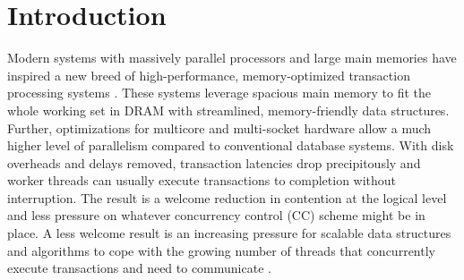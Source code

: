 
\section{Introduction}

Modern systems with massively parallel processors and large main memories have inspired a new breed of high-performance, memory-optimized transaction processing systems \cite{Kallman+08,PandisJHA10,KemperN11,LarsonBDFPZ11,LevandoskiLSSW15,TuZKLM13}. These systems leverage spacious main memory to fit the whole working set in DRAM with streamlined, memory-friendly data structures. Further, optimizations for multicore and multi-socket hardware allow a much higher level of parallelism compared to conventional database systems. With disk overheads and delays removed, transaction latencies drop precipitously and worker threads can usually execute transactions to completion without interruption. The result is a welcome reduction in contention at the logical level and less pressure on whatever concurrency control (CC) scheme might be in place. A less welcome result is an increasing pressure for scalable data structures and algorithms to cope with the growing number of threads that concurrently execute transactions and need to communicate \cite{JohnsonPA13}.


